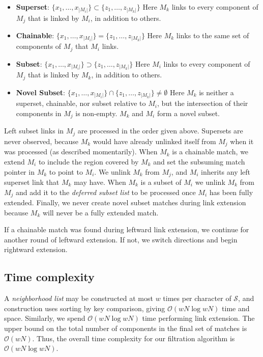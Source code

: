\documentclass{llncs}
\begin{document}
\begin{itemize}
\item \textbf{Superset}:  $\{x_1,\dots,x_{|M_i|}\} \subset \{z_1, \dots, z_{|M_k|}\}$
Here $M_k$ links to every component of $M_j$ that is linked by
$M_i$, in addition to others.
\item \textbf{Chainable}:   $\{x_1,\dots,x_{|M_i|}\} = \{z_1, \dots, z_{|M_k|}\}$
Here $M_k$ links to the same set of components of $M_j$ that $M_i$
links.
\item \textbf{Subset}: $\{x_1,\dots,x_{|M_i|}\} \supset \{z_1, \dots, z_{|M_k|}\}$
Here $M_i$ links to every component of $M_j$ that is linked by
$M_k$, in addition to others.
\item \textbf{Novel Subset}:  $\{x_1,\dots,x_{|M_i|}\} \cap \{z_1, \dots, z_{|M_k|}\} \neq \emptyset$
Here $M_k$ is neither a superset, chainable, nor subset relative to
$M_i$, but the intersection of their components in $M_j$ is
non-empty.  $M_k$ and $M_i$ form a novel subset.
\end{itemize}

Left subset links in $M_j$ are processed in the order given above.
Supersets are never observed, because $M_k$ would have already
unlinked itself from $M_j$ when it was processed (as described
momentarily). When $M_k$ is a chainable match, we extend $M_i$ to
include the region covered by $M_k$ and set the subsuming match
pointer in $M_k$ to point to $M_i$.  We unlink $M_k$ from $M_j$, and
$M_i$ inherits any left superset link that $M_k$ may have.  When
$M_k$ is a subset of $M_i$ we unlink $M_k$ from $M_j$ and add it to
the \textit{deferred subset list} to be processed once $M_i$ has
been fully extended. Finally, we never create novel subset matches
during link extension because $M_k$ will never be a fully extended
match.

If a chainable match was found during leftward link extension, we
continue for another round of leftward extension. If not, we switch
directions and begin rightward extension.

\subsection{Time complexity}
A \textit{neighborhood list} may be constructed at most $w$ times
per character of $\mathcal{S}$, and construction uses sorting by key
comparison, giving $\mathcal{O}(wN \log wN)$ time and space.
Similarly, we spend $\mathcal{O}(wN \log wN)$ time performing link
extension. The upper bound on the total number of components in the
final set of matches is $\mathcal{O}(wN)$. Thus, the overall time
complexity for our filtration algorithm is $\mathcal{O}(wN \log
wN)$.
\end{document}
